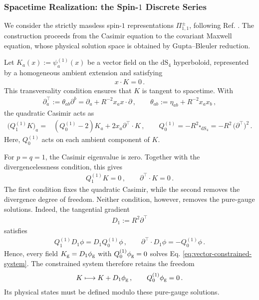 \documentclass{SciPost}
\begin{document}
\subsubsection{Spacetime Realization: the Spin-$1$ Discrete Series} \label{sec:vector-spacetime}

We consider the strictly massless spin-$1$ representations $\Pi_{1,1}^{\pm}$, following Ref. \cite{takVec}. The construction proceeds from the Casimir equation to the covariant Maxwell equation, whose physical solution space is obtained by Gupta--Bleuler reduction.

Let $K_a(x):=\psi^{(1)}_a(x)$ be a vector field on the $\mathrm{dS}_{4}$ hyperboloid, represented by a homogeneous ambient extension and satisfying
\begin{align}
    x\cdot K=0 \,.
\end{align}
This transversality condition ensures that $K$ is tangent to spacetime. With
\begin{align}
    \partial^{\top}_a
    :=\theta_{ab}\partial^b
    =\partial_a+R^{-2}x_a x\cdot\partial \,,
    \qquad
    \theta_{ab}:=\eta_{ab}+R^{-2}x_a x_b \,,
\end{align}
the quadratic Casimir acts as
\begin{align}\label{Q1}
    \bigl(Q^{(1)}_1K\bigr)_a
    =&(Q^{(1)}_0-2)K_a
      +2x_a\partial^{\top}\cdot K \,,
    \qquad
    Q^{(1)}_0=-R^2\square_{\mathrm{dS}_{4}}
             =-R^2\, \big(\partial^{\top}\big)^2 \,.
\end{align}
Here, $Q^{(1)}_0$ acts on each ambient component of $K$.

For $p=q=1$, the Casimir eigenvalue is zero. Together with the divergencelessness condition, this gives 
\begin{align}\label{eq:vector-constrained-system}
    Q^{(1)}_1K=0 \,,
    \qquad
    \partial^{\top}\cdot K=0 \,.
\end{align}
The first condition fixes the quadratic Casimir, while the second removes the divergence degree of freedom. Neither condition, however, removes the pure-gauge solutions. Indeed, the tangential gradient
\begin{align}
    D_1:=R^2\partial^{\top}
\end{align}
satisfies
\begin{align}\label{eq:vector-gauge-identities}
    Q^{(1)}_1D_1\phi=D_1Q^{(1)}_0\phi \,,
    \qquad
    \partial^{\top}\cdot D_1\phi= - Q^{(1)}_0\phi \,.
\end{align}
Hence, every field $K_{\rm g}=D_1\phi_{\rm g}$ with $Q^{(1)}_0\phi_{\rm g}=0$ solves Eq. \eqref{eq:vector-constrained-system}. The constrained system therefore retains the freedom
\begin{align}\label{eq:vector-residual-gauge}
    K\longmapsto K+D_1\phi_{\rm g} \,,
    \qquad
    Q^{(1)}_0\phi_{\rm g}=0 \,.
\end{align}
Its physical states must be defined modulo these pure-gauge solutions.
\end{document}
